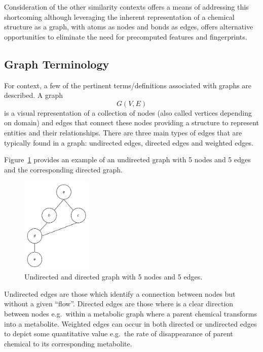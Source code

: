 \documentclass[
  super,
  preprint,
  3p]{elsarticle}
\begin{document}
Consideration of the other similarity contexts offers a means of
addressing this shortcoming although leveraging the inherent
representation of a chemical structure as a graph, with atoms as nodes
and bonds as edges, offers alternative opportunities to eliminate the
need for precomputed features and fingerprints.

\subsection{Graph Terminology}\label{graph-terminology}

For context, a few of the pertinent terms/definitions associated with
graphs are described. A graph \[ G(V, E) \] is a visual representation
of a collection of nodes (also called vertices depending on domain) and
edges that connect these nodes providing a structure to represent
entities and their relationships. There are three main types of edges
that are typically found in a graph: undirected edges, directed edges
and weighted edges.

Figure~\ref{fig-gg} provides an example of an undirected graph with 5
nodes and 5 edges and the corresponding directed graph.

\begin{figure}

\begin{minipage}{\linewidth}

\includegraphics[width=0.3\textwidth,height=\textheight]{fig-gp.png}

\end{minipage}%

\caption{\label{fig-gg}Undirected and directed graph with 5 nodes and 5
edges.}

\end{figure}%

Undirected edges are those which identify a connection between nodes but
without a given ``flow''. Directed edges are those where is a clear
direction between nodes e.g.~within a metabolic graph where a parent
chemical transforms into a metabolite. Weighted edges can occur in both
directed or undirected edges to depict some quantitative value e.g.~the
rate of disappearance of parent chemical to its corresponding
metabolite.
\end{document}

